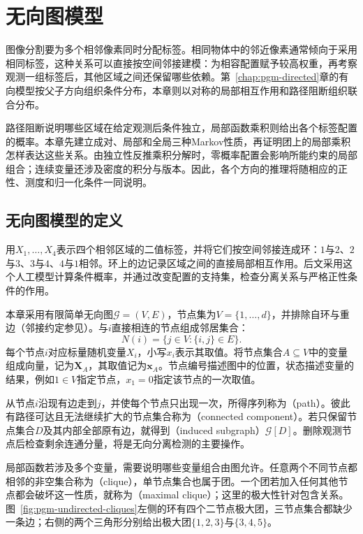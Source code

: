 \chapter{无向图模型}
\label{chap:pgm-undirected}

图像分割要为多个相邻像素同时分配标签。相同物体中的邻近像素通常倾向于采用相同标签，这种关系可以直接按空间邻接建模：为相容配置赋予较高权重，再考察观测一组标签后，其他区域之间还保留哪些依赖。第~\ref{chap:pgm-directed}章的有向模型按父子方向组织条件分布，本章则以对称的局部相互作用和路径阻断组织联合分布。

路径阻断说明哪些区域在给定观测后条件独立，局部函数乘积则给出各个标签配置的概率。本章先建立成对、局部和全局三种Markov性质，再证明团上的局部乘积怎样表达这些关系。由独立性反推乘积分解时，零概率配置会影响所能约束的局部组合；连续变量还涉及密度的积分与版本。因此，各个方向的推理将随相应的正性、测度和归一化条件一同说明。

\section{无向图模型的定义}
\label{sec:pgm-undirected-definition}

用$X_1,\ldots,X_4$表示四个相邻区域的二值标签，并将它们按空间邻接连成环：$1$与$2$、$2$与$3$、$3$与$4$、$4$与$1$相邻。环上的边记录区域之间的直接局部相互作用。后文采用这个人工模型计算条件概率，并通过改变配置的支持集，检查分离关系与严格正性条件的作用。

本章采用有限简单无向图$\mathcal G=(V,E)$，节点集为$V=\{1,\ldots,d\}$，并排除自环与重边（邻接约定参见）。与$i$直接相连的节点组成邻居集合：
\[
  N(i)=\{j\in V:\{i,j\}\in E\}.
\]
每个节点$i$对应标量随机变量$X_i$，小写$x_i$表示其取值。将节点集合$A\subseteq V$中的变量组成向量，记为$\bm{X}_A$，其取值记为$\bm{x}_A$。节点编号描述图中的位置，状态描述变量的结果，例如$1\in V$指定节点，$x_1=0$指定该节点的一次取值。

从节点$i$沿现有边走到$j$，并使每个节点只出现一次，所得序列称为（path）。彼此有路径可达且无法继续扩大的节点集合称为（connected component）。若只保留节点集合$D$及其内部全部原有边，就得到（induced subgraph）$\mathcal{G}[D]$。删除观测节点后检查剩余连通分量，将是无向分离检测的主要操作。

局部函数若涉及多个变量，需要说明哪些变量组合由图允许。任意两个不同节点都相邻的非空集合称为（clique），单节点集合也属于团。一个团若加入任何其他节点都会破坏这一性质，就称为（maximal clique）；这里的极大性针对包含关系。图~\ref{fig:pgm-undirected-cliques}左侧的环有四个二节点极大团，三节点集合都缺少一条边；右侧的两个三角形分别给出极大团$\{1,2,3\}$与$\{3,4,5\}$。

